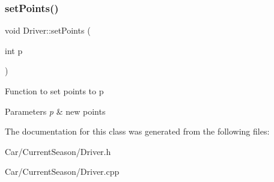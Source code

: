 \subsubsection{\texorpdfstring{set\+Points()}{setPoints()}}
{\footnotesize\ttfamily void Driver\+::set\+Points (\begin{DoxyParamCaption}\item[{int}]{p }\end{DoxyParamCaption})}

Function to set points to p 
\begin{DoxyParams}{Parameters}
{\em p} & new points \\
\hline
\end{DoxyParams}


The documentation for this class was generated from the following files\+:\begin{DoxyCompactItemize}
\item 
Car/\+Current\+Season/Driver.\+h\item 
Car/\+Current\+Season/Driver.\+cpp\end{DoxyCompactItemize}
